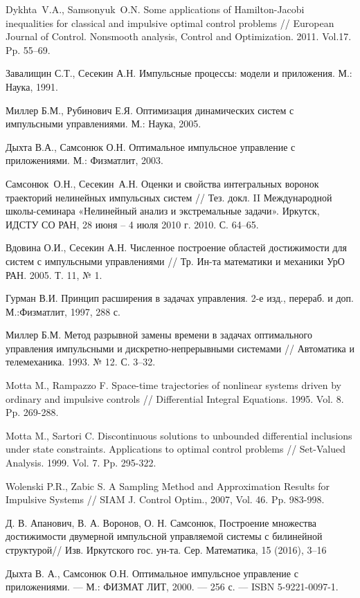 \pagebreak
\begin{thebibliography}{99}

 { Dykhta~V.A., Samsonyuk~O.N.}  Some applications of
  Hamilton-Jacobi inequalities for classical and impulsive optimal
  control problems // European Journal of Control. Nonsmooth analysis,
  Control and Optimization. 2011. Vol.17. Pp. 55--69.

 { Завалищин С.Т., Сесекин А.Н.}  {Импульсные
    процессы: модели и приложения}.  М.: Наука, 1991.

 { Миллер Б.М., Рубинович Е.Я.}  { Оптимизация
    динамических систем с импульсными управлениями}.  М.: Наука, 2005.

 { Дыхта В.А., Самсонюк О.Н.}  Оптимальное импульсное
  управление с приложениями.  М.: Физматлит, 2003.

 { Самсонюк~О.Н., Сесекин~А.Н.} Оценки и свойства
  интегральных воронок траекторий нелинейных импульсных систем //
  Тез. докл. II Международной школы-семинара «Нелинейный анализ и
  экстремальные задачи». Иркутск, ИДСТУ СО РАН, 28 июня -- 4 июля 2010
  г. 2010. С. 64--65.

 Вдовина О.И., Сесекин А.Н. Численное построение
  областей достижимости для систем с импульсными управлениями //
  Тр. Ин-та математики и механики УрО РАН.  2005. Т. 11, № 1.

 Гурман В.И. Принцип расширения в задачах
  управления. 2-е изд., перераб. и доп. М.:Физматлит, 1997, 288 с.

 Миллер Б.М. Метод разрывной замены времени в задачах
  оптимального управления импульсными и дискретно-непрерывными
  системами // Автоматика и телемеханика. 1993. № 12. С. 3--32.

 Motta M., Rampazzo F. Space-time trajectories of
  nonlinear systems driven by ordinary and impulsive controls //
  Differential Integral Equations. 1995. Vol. 8.  Pp. 269-288.

 Motta M., Sartori C. Discontinuous solutions to
  unbounded differential inclusions under state constraints.
  Applications to optimal control problems // Set-Valued
  Analysis. 1999. Vol. 7. Pp. 295-322.

 Wolenski P.R., Zabic S.  A Sampling Method and
  Approximation Results for Impulsive Systems // SIAM J. Control
  Optim., 2007, Vol. 46. Pp. 983-998.

 {Д. В. Апанович, В. А. Воронов, О. Н. Самсонюк},
  Построение множества достижимости двумерной импульсной управляемой
  системы с билинейной структурой// Изв. Иркутского
  гос. ун-та. Сер. Математика, 15 (2016), 3–16

 {Дыхта В. А., Самсонюк О.Н.} Оптимальное импульсное
  управление с приложениями. — М.: ФИЗМАТ ЛИТ, 2000. — 256 с. — ISBN
  5-9221-0097-1.


\end{thebibliography}


